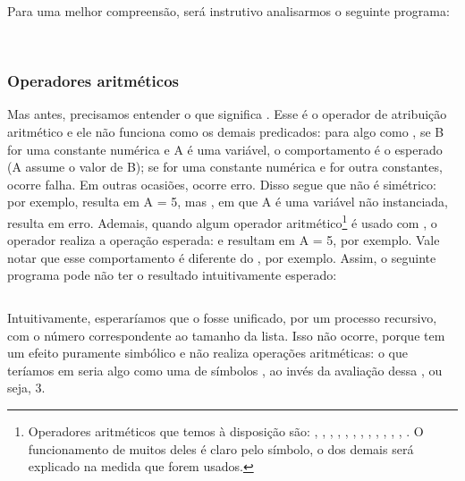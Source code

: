 \documentclass{article}
\begin{document}
Para uma melhor compreensão, será instrutivo analisarmos o seguinte
programa: \\ \\

    \begin{listing}
\inputminted{prolog}{../Exemplos/Cap3/prog2_length.pl}
\caption{Length 0}\label{lst:length}
    \end{listing}

\subsubsection{Operadores aritméticos}

Mas antes, precisamos entender o que significa . Esse  é o operador de atribuição aritmético e ele
não funciona como os demais predicados: para algo como , se B for uma constante numérica e A é uma variável, o
comportamento é o esperado (A assume o valor de B); se  for uma
constante numérica e  for outra constantes, ocorre falha. Em
outras ocasiões, ocorre erro.  Disso segue que  não é
simétrico: por exemplo,  resulta em A = 5, mas
, em que A é uma variável não instanciada, resulta em
erro. Ademais, quando algum operador aritmético\footnote{Operadores
  aritméticos que temos à disposição são: , ,
  , , , ,
  , , , ,
  , , . O funcionamento de
  muitos deles é claro pelo símbolo, o dos demais será explicado na
  medida que forem usados.}  é usado com ,
o operador realiza a operação esperada:  e
 resultam em A = 5, por exemplo. Vale notar que
esse comportamento é diferente do , por exemplo. Assim, o
seguinte programa pode não ter o resultado intuitivamente esperado:

    \begin{listing}
\inputminted{prolog}{../Exemplos/Cap3/prog3_length1.pl}
  \caption{Length 1}\label{lst:length1}
    \end{listing}

\noindent Intuitivamente, esperaríamos que o  fosse unificado,
por um processo recursivo, com o número correspondente ao tamanho da
lista. Isso não ocorre, porque  tem um efeito puramente
simbólico e não realiza operações aritméticas: o que teríamos em
 seria algo como uma  de símbolos
, ao invés da avaliação dessa , ou
seja, 3.
\end{document}
